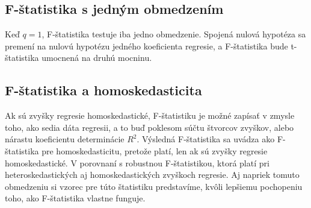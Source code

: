 \documentclass[]{tukediphc}
\begin{document}
\subsection{F-štatistika s jedným obmedzením}

Keď $q = 1$, F-štatistika testuje iba jedno obmedzenie. Spojená nulová hypotéza sa premení na nulovú hypotézu jedného koeficienta regresie, a F-štatistika bude t-štatistika umocnená na druhú mocninu.  

\subsection{F-štatistika a homoskedasticita}

Ak sú zvyšky regresie homoskedastické, F-štatistiku je možné zapísať v zmysle toho, ako sedia dáta regresii, a to buď poklesom súčtu štvorcov zvyškov, alebo nárastu koeficientu determinácie $R^2$. Výsledná F-štatistika sa uvádza ako F-štatistika pre homoskedasticitu, pretože platí, len ak sú zvyšky regresie homoskedastické. V porovnaní s robustnou F-štatistikou, ktorá platí pri heteroskedastických aj homoskedastických zvyškoch regresie. Aj napriek tomuto obmedzeniu si vzorec pre túto štatistiku predstavíme, kvôli lepšiemu pochopeniu toho, ako F-štatistika vlastne funguje. 
\end{document}
